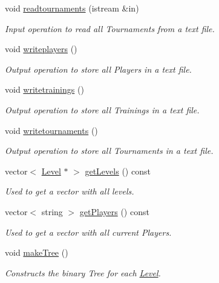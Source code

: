 \begin{DoxyCompactItemize}
void \hyperlink{class_club_ae7453aa640951df46424975ecfcbbbca}{readtournaments} (istream \&in)
\begin{DoxyCompactList}\small\item\em Input operation to read all Tournaments from a text file. \end{DoxyCompactList}\item 
void \hyperlink{class_club_acc8a8c5175c6f90db4056dd6a1e98b67}{writeplayers} ()
\begin{DoxyCompactList}\small\item\em Output operation to store all Players in a text file. \end{DoxyCompactList}\item 
void \hyperlink{class_club_a4784eaf929c6c72559ad0f6ba2895a8f}{writetrainings} ()
\begin{DoxyCompactList}\small\item\em Output operation to store all Trainings in a text file. \end{DoxyCompactList}\item 
void \hyperlink{class_club_a89dfe233c69897a1d5abd9d7951990d8}{writetournaments} ()
\begin{DoxyCompactList}\small\item\em Output operation to store all Tournaments in a text file. \end{DoxyCompactList}\item 
vector$<$ \hyperlink{class_level}{Level} $\ast$ $>$ \hyperlink{class_club_ad196e0999b3c18c1ed3e757ccf70b92d}{get\+Levels} () const
\begin{DoxyCompactList}\small\item\em Used to get a vector with all levels. \end{DoxyCompactList}\item 
vector$<$ string $>$ \hyperlink{class_club_ae3423e40b8af98a1e3844cbdc0ca87f7}{get\+Players} () const
\begin{DoxyCompactList}\small\item\em Used to get a vector with all current Players. \end{DoxyCompactList}\item 
void \hyperlink{class_club_a44a4556487884659d9b316dc6c961e86}{make\+Tree} ()
\begin{DoxyCompactList}\small\item\em Constructs the binary Tree for each \hyperlink{class_level}{Level}. \end{DoxyCompactList}\item 

\end{DoxyCompactItemize}
